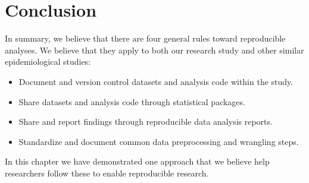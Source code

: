 % 
% 


\section{Conclusion}
In summary, we believe that there are four general rules toward reproducible
analyses. We believe that they apply to both our research study and other
similar epidemiological 
studies:
\begin{itemize} 
    \item Document and version control datasets and analysis code within the
        study. 
    \item Share datasets and analysis code through statistical packages. 
    \item Share and report findings through reproducible data analysis reports. 
    \item Standardize and document common data preprocessing and wrangling
        steps.
\end{itemize} 

In this chapter we have demonstrated one approach that we believe help
researchers follow these to enable reproducible research. 

